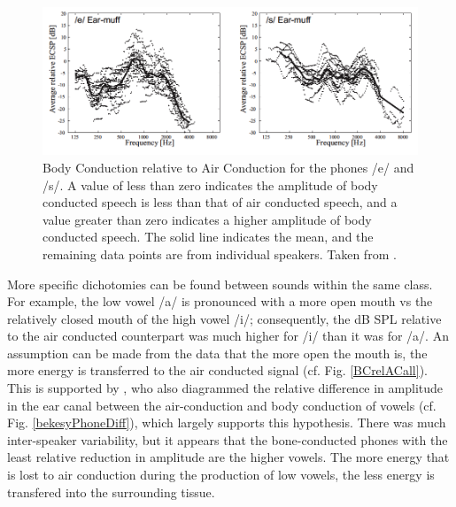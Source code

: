\documentclass[dissertation,copyright]{uathesis}
\begin{document}
\begin{figure}
\includegraphics[width=1\textwidth]{figure/BCrelAC_e_s.png}
\caption{Body Conduction relative to Air Conduction for the phones /e/ and /s/.  A value of less than zero indicates the amplitude of body conducted speech is less than that of air conducted speech, and a value greater than zero indicates a higher amplitude of body conducted speech. The solid line indicates the mean, and the remaining data points are from individual speakers.  Taken from \cite{reinfeldt:10}.}
\label{BCrelAC}
\end{figure}

More specific dichotomies can be found between sounds within the same class. For example, the low vowel /a/ is pronounced with a more open mouth vs the relatively closed mouth of the high vowel /i/; consequently, the dB SPL relative to the air conducted counterpart was much higher for /i/ than it was for /a/. An assumption can be made from the data that the more open the mouth is, the more energy is transferred to the air conducted signal (cf. Fig. \ref{BCrelACall}).  This is supported by \cite{bekesy:60}, who also diagrammed the relative difference in amplitude in the ear canal between the air-conduction and body conduction of vowels (cf. Fig. \ref{bekesyPhoneDiff}), which largely supports this hypothesis.  There was much inter-speaker variability, but it appears that the bone-conducted phones with the least relative reduction in amplitude are the higher vowels.  The more energy that is lost to air conduction during the production of low vowels, the less energy is transfered into the surrounding tissue.
\end{document}
